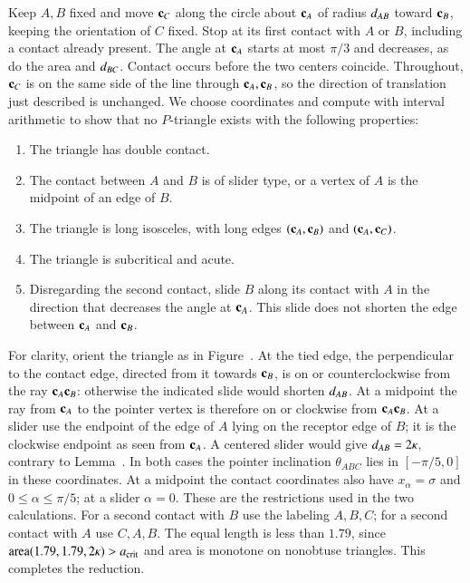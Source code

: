 Keep $A,B$ fixed and move ${\mathbf c}_C$ along the circle about ${\mathbf c}_A$
of radius $d_{AB}$ toward ${\mathbf c}_B$, keeping the orientation of $C$
fixed. Stop at its first contact with $A$ or $B$, including a contact
already present. The angle at ${\mathbf c}_A$ starts at most $\pi/3$ and
decreases, as do the area and $d_{BC}$. Contact occurs before the
two centers coincide. Throughout, ${\mathbf c}_C$ is on the same side of
the line through ${\mathbf c}_A,{\mathbf c}_B$, so the direction of translation just
described is unchanged.
 We choose coordinates and
compute with interval
arithmetic to show that no $P$-triangle exists with the
following properties:
\begin{enumerate}
\item The triangle has double contact.
\item The contact between $A$ and $B$ is
  of slider type, or a vertex of $A$ is the midpoint of an edge of $B$.
\item The triangle is long isosceles, with long edges $({\mathbf c}_A,{\mathbf c}_B)$ and $({\mathbf c}_A,{\mathbf c}_C)$.
\item The triangle is subcritical and acute.
\item Disregarding the second contact, slide $B$ along its contact with
  $A$ in the direction that decreases the angle at ${\mathbf c}_A$. This slide
  does not shorten the edge between ${\mathbf c}_A$ and ${\mathbf c}_B$.
\end{enumerate}
For clarity, orient the triangle as in Figure~.
At the tied edge, the perpendicular to the contact edge, directed from
it towards ${\mathbf c}_B$, is on or counterclockwise from the ray
${\mathbf c}_A{\mathbf c}_B$: otherwise the indicated slide would shorten $d_{AB}$.
At a midpoint the ray from ${\mathbf c}_A$ to the pointer vertex is therefore
on or clockwise from ${\mathbf c}_A{\mathbf c}_B$. At a slider use the endpoint of the
edge of $A$ lying on the receptor edge of $B$; it is the clockwise
endpoint as seen from ${\mathbf c}_A$. A centered slider would give
$d_{AB}=2\kappa$, contrary to Lemma~.
In both cases the pointer inclination $\theta_{ABC}$ lies in
$[-\pi/5,0]$ in these coordinates. At a midpoint the contact
coordinates also have $x_\alpha=\sigma$ and $0\le\alpha\le\pi/5$;
at a slider $\alpha=0$. These are the restrictions used in the two
calculations. For a second contact with $B$ use the labeling $A,B,C$;
for a second contact with $A$ use $C,A,B$. The equal length is less
than $1.79$, since ${\operatorname{area}}(1.79,1.79,2\kappa)>a_\text{crit}$ and area is
monotone on nonobtuse triangles. This completes the reduction.


